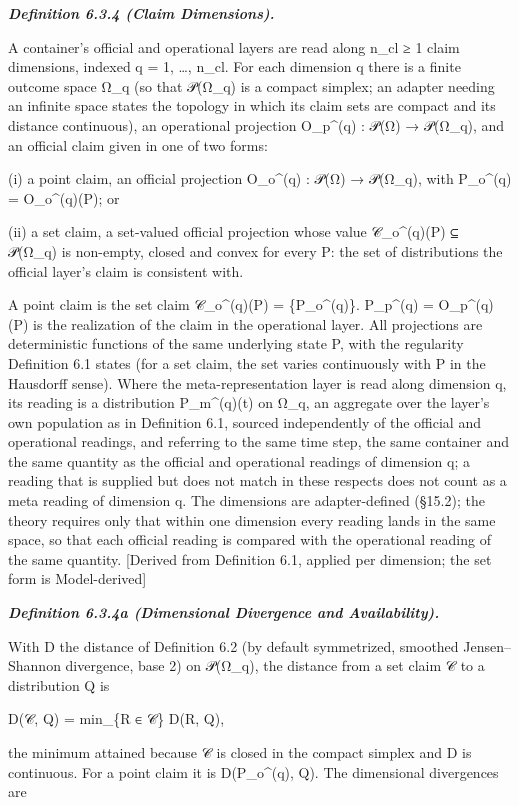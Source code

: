 \documentclass[
]{article}
\begin{document}
\emph{\textbf{Definition 6.3.4 (Claim Dimensions).}}

A container's official and operational layers are read along n\_cl ≥ 1
claim dimensions, indexed q = 1, \ldots, n\_cl. For each dimension q
there is a finite outcome space Ω\_q (so that 𝒫(Ω\_q) is a compact
simplex; an adapter needing an infinite space states the topology in
which its claim sets are compact and its distance continuous), an
operational projection O\_p\^{}(q) : 𝒫(Ω) → 𝒫(Ω\_q), and an official
claim given in one of two forms:

(i) a point claim, an official projection O\_o\^{}(q) : 𝒫(Ω) → 𝒫(Ω\_q),
with P\_o\^{}(q) = O\_o\^{}(q)(P); or

(ii) a set claim, a set-valued official projection whose value
𝒞\_o\^{}(q)(P) ⊆ 𝒫(Ω\_q) is non-empty, closed and convex for every P:
the set of distributions the official layer's claim is consistent with.

A point claim is the set claim 𝒞\_o\^{}(q)(P) = \{P\_o\^{}(q)\}.
P\_p\^{}(q) = O\_p\^{}(q)(P) is the realization of the claim in the
operational layer. All projections are deterministic functions of the
same underlying state P, with the regularity Definition 6.1 states (for
a set claim, the set varies continuously with P in the Hausdorff sense).
Where the meta-representation layer is read along dimension q, its
reading is a distribution P\_m\^{}(q)(t) on Ω\_q, an aggregate over the
layer's own population as in Definition 6.1, sourced independently of
the official and operational readings, and referring to the same time
step, the same container and the same quantity as the official and
operational readings of dimension q; a reading that is supplied but does
not match in these respects does not count as a meta reading of
dimension q. The dimensions are adapter-defined (§15.2); the theory
requires only that within one dimension every reading lands in the same
space, so that each official reading is compared with the operational
reading of the same quantity. {[}Derived from Definition 6.1, applied
per dimension; the set form is Model-derived{]}

\emph{\textbf{Definition 6.3.4a (Dimensional Divergence and
Availability).}}

With D the distance of Definition 6.2 (by default symmetrized, smoothed
Jensen--Shannon divergence, base 2) on 𝒫(Ω\_q), the distance from a set
claim 𝒞 to a distribution Q is

D(𝒞, Q) = min\_\{R ∈ 𝒞\} D(R, Q),

the minimum attained because 𝒞 is closed in the compact simplex and D is
continuous. For a point claim it is D(P\_o\^{}(q), Q). The dimensional
divergences are
\end{document}
